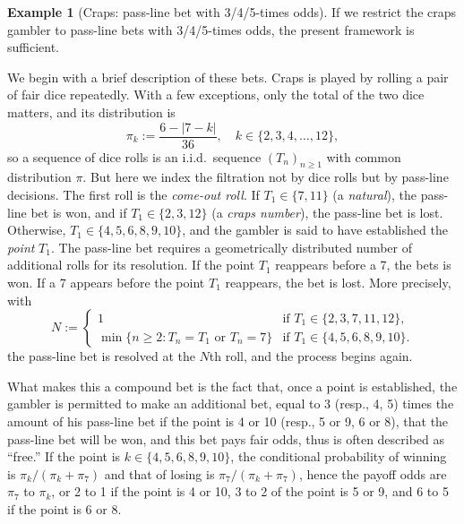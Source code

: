\documentclass{article}
\theoremstyle{definition}
\newtheorem{example}[theorem]{Example}
\theoremstyle{remark}
\begin{document}
\begin{example}[Craps: pass-line bet with 3/4/5-times odds]\label{example:craps} If we restrict the craps gambler to pass-line bets with 3/4/5-times odds, the present framework is sufficient.  

We begin with a brief description of these bets.  Craps is played by rolling a pair of fair dice repeatedly.  With a few exceptions, only the total of the two dice matters, and its distribution is
\[
\pi_k:=\frac{6-|7-k|}{36},\quad k\in\{2,3,4,\ldots,12\},
\]
so a sequence of dice rolls is an i.i.d.\ sequence $(T_n)_{n\ge1}$ with common distribution $\pi$. 
But here we index the filtration not by dice rolls but by pass-line decisions.  The first roll is the \textit{come-out roll}.  If $T_1\in\{7,11\}$ (a \textit{natural}), the pass-line bet is won, and if $T_1\in\{2,3,12\}$ (a \textit{craps number}), the pass-line bet is lost.  Otherwise, $T_1\in \{4,5,6,8,9,10\}$, and the gambler is said to have established the \textit{point} $T_1$.  The pass-line bet requires a geometrically distributed number of additional rolls for its resolution.  If the point $T_1$ reappears before a 7, the bets is won.  If a 7 appears before the point $T_1$ reappears, the bet is lost.  More precisely, with
\[
N:=\begin{cases}1&\text{if $T_1\in\{2,3,7,11,12\}$},\\
\min\{n\ge2:T_n=T_1\text{ or }T_n=7\}&\text{if $T_1\in\{4,5,6,8,9,10\}$}.\end{cases}
\]
the pass-line bet is resolved at the $N$th roll, and the process begins again.

What makes this a compound bet is the fact that, once a point is established, the gambler is permitted to make an additional bet, equal to 3 (resp., 4, 5) times the amount of his pass-line bet if the point is 4 or 10 (resp., 5 or 9, 6 or 8), that the pass-line bet will be won, and this bet pays fair odds, thus is often described as ``free.''  If the point is $k\in\{4,5,6,8,9,10\}$, the conditional probability of winning is $\pi_k/(\pi_k+\pi_7)$ and that of losing is $\pi_7/(\pi_k+\pi_7)$, hence the payoff odds are $\pi_7$ to $\pi_k$, or 2 to 1 if the point is 4 or 10, 3 to 2 of the point is 5 or 9, and 6 to 5 if the point is 6 or 8.


\end{example}
\end{document}
